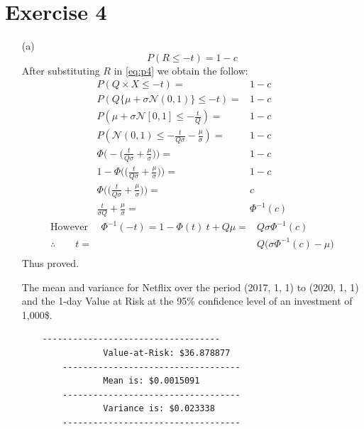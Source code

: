 \documentclass[12pt,a4paper]{article}
\begin{document}
\section*{Exercise 4}
\begin{enumerate}
	\item[(a)] 
		\begin{equation}
        P(R\leq -t) = 1-c
        \label{eq:p4}
    \end{equation}
    After substituting $R$   in \eqref{eq:p4} we obtain the follow:
    \begin{align*}
        P(Q\times X\le -t) =& 1-c\\
        P(Q\{\mu + \sigma \mathcal{N}(0,1)\} \le -t)  =& 1-c\\
        P(\mu +\sigma \mathcal{N}[0,1] \le - \frac{t}{Q}) =& 1-c\\
        P ( \mathcal{N}(0,1)\leq -\frac{t}{Q\sigma} - \frac{\mu}{\sigma} ) =& 1-c\\
        \Phi\bigg( -\bigg( \frac{t}{Q \sigma} + \frac{\mu}{\sigma}\bigg)\bigg) =& 1-c\\
        1 - \Phi\bigg(\bigg( \frac{t}{Q \sigma} + \frac{\mu}{\sigma}\bigg)\bigg) =& 1-c\\
        \Phi\bigg( \bigg( \frac{t}{Q \sigma} + \frac{\mu}{\sigma}\bigg)\bigg) =& c\\
        \frac{t}{\sigma Q} + \frac{\mu}{\sigma} = & \Phi^{-1} (c)
    \end{align*}
    \begin{align*}
    		   \text{However } \quad  \Phi^{-1} (-t)  = 1- \Phi (t)\
        t + Q\mu = & Q \sigma \Phi^{-1} (c)\\
        \therefore \quad \quad t = & Q\bigg( \sigma \Phi^{-1}(c) - \mu  \bigg)\\
    \end{align*}
Thus proved.
\begin{spacing}{1.7}
	 The mean and variance for Netflix  over the period (2017, 1, 1) to (2020, 1, 1) and  the 1-day Value at Risk at the 95\% confidence level of an investment of 1,000\$.
	 \begin{verbatim}
	-----------------------------------
				Value-at-Risk: $36.878877
		-----------------------------------
				Mean is: $0.0015091
		-----------------------------------
				Variance is: $0.023338
		-----------------------------------
	 \end{verbatim}
\end{spacing}
\end{enumerate}
\end{document}

